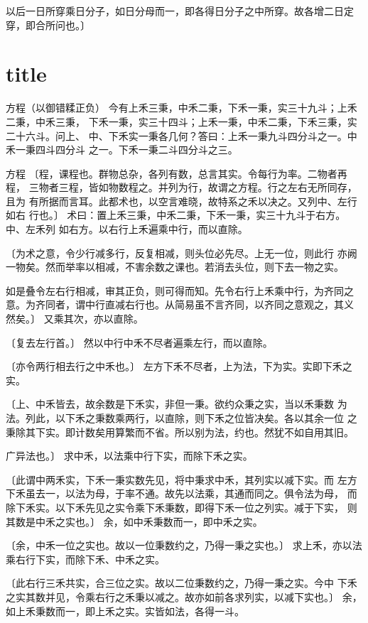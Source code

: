 \documentclass[a4paper,12pt,UTF8,twoside]{ctexbook}
\begin{document}
以后一日所穿乘日分子，如日分母而一，即各得日分子之中所穿。故各增二日定 穿，即合所问也。〕

\chapter{title}
方程（以御错糅正负） 今有上禾三秉，中禾二秉，下禾一秉，实三十九斗；上禾二秉，中禾三秉， 下禾一秉，实三十四斗；上禾一秉，中禾二秉，下禾三秉，实二十六斗。问上、 中、下禾实一秉各几何？答曰：上禾一秉九斗四分斗之一。中禾一秉四斗四分斗 之一。下禾一秉二斗四分斗之三。

方程 〔程，课程也。群物总杂，各列有数，总言其实。令每行为率。二物者再程， 三物者三程，皆如物数程之。并列为行，故谓之方程。行之左右无所同存，且为 有所据而言耳。此都术也，以空言难晓，故特系之禾以决之。又列中、左行如右 行也。〕 术曰：置上禾三秉，中禾二秉，下禾一秉，实三十九斗于右方。中、左禾列 如右方。以右行上禾遍乘中行，而以直除。

〔为术之意，令少行减多行，反复相减，则头位必先尽。上无一位，则此行 亦阙一物矣。然而举率以相减，不害余数之课也。若消去头位，则下去一物之实。

如是叠令左右行相减，审其正负，则可得而知。先令右行上禾乘中行，为齐同之 意。为齐同者，谓中行直减右行也。从简易虽不言齐同，以齐同之意观之，其义 然矣。〕 又乘其次，亦以直除。

〔复去左行首。〕 然以中行中禾不尽者遍乘左行，而以直除。

〔亦令两行相去行之中禾也。〕 左方下禾不尽者，上为法，下为实。实即下禾之实。

〔上、中禾皆去，故余数是下禾实，非但一秉。欲约众秉之实，当以禾秉数 为法。列此，以下禾之秉数乘两行，以直除，则下禾之位皆决矣。各以其余一位 之秉除其下实。即计数矣用算繁而不省。所以别为法，约也。然犹不如自用其旧。

广异法也。〕 求中禾，以法乘中行下实，而除下禾之实。

〔此谓中两禾实，下禾一秉实数先见，将中秉求中禾，其列实以减下实。而 左方下禾虽去一，以法为母，于率不通。故先以法乘，其通而同之。俱令法为母， 而除下禾实。以下禾先见之实令乘下禾秉数，即得下禾一位之列实。减于下实， 则其数是中禾之实也。〕 余，如中禾秉数而一，即中禾之实。

〔余，中禾一位之实也。故以一位秉数约之，乃得一秉之实也。〕 求上禾，亦以法乘右行下实，而除下禾、中禾之实。

〔此右行三禾共实，合三位之实。故以二位秉数约之，乃得一秉之实。今中 下禾之实其数并见，令乘右行之禾秉以减之。故亦如前各求列实，以减下实也。〕 余，如上禾秉数而一，即上禾之实。实皆如法，各得一斗。
\end{document}
